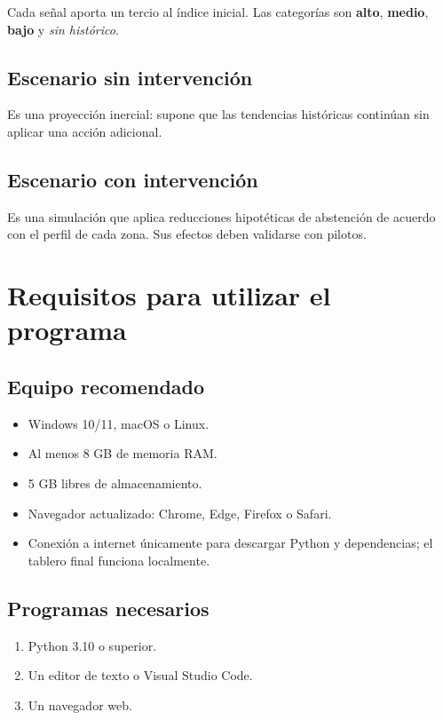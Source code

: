 \documentclass[11pt,a4paper]{article}
\newcommand{\alto}{\textcolor{riskred}{\textbf{alto}}}
\newcommand{\medio}{\textcolor{riskamber}{\textbf{medio}}}
\newcommand{\bajo}{\textcolor{riskgreen}{\textbf{bajo}}}
\begin{document}
Cada señal aporta un tercio al índice inicial. Las categorías son \alto{}, \medio{}, \bajo{} y \textit{sin histórico}.

\subsection{Escenario sin intervención}

Es una proyección inercial: supone que las tendencias históricas continúan sin aplicar una acción adicional.

\subsection{Escenario con intervención}

Es una simulación que aplica reducciones hipotéticas de abstención de acuerdo con el perfil de cada zona. Sus efectos deben validarse con pilotos.

\section{Requisitos para utilizar el programa}

\subsection{Equipo recomendado}

\begin{itemize}
    \item Windows 10/11, macOS o Linux.
    \item Al menos 8 GB de memoria RAM.
    \item 5 GB libres de almacenamiento.
    \item Navegador actualizado: Chrome, Edge, Firefox o Safari.
    \item Conexión a internet únicamente para descargar Python y dependencias; el tablero final funciona localmente.
\end{itemize}

\subsection{Programas necesarios}

\begin{enumerate}
    \item Python 3.10 o superior.
    \item Un editor de texto o Visual Studio Code.
    \item Un navegador web.
\end{enumerate}
\end{document}
